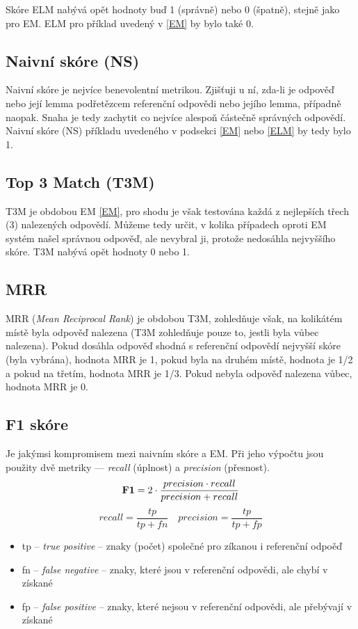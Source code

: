 Skóre ELM nabývá opět hodnoty buď 1 (správně) nebo 0 (špatně), stejně jako pro EM. ELM pro příklad uvedený v \ref{EM} by bylo také 0.

\subsection{Naivní skóre (NS)}
Naivní skóre je nejvíce benevolentní metrikou. Zjišťuji u ní, zda-li je odpověď nebo její lemma podřetězcem referenční odpovědi nebo jejího lemma, případně naopak. Snaha je tedy zachytit co nejvíce alespoň částečně správných odpovědí. Naivní skóre (NS) příkladu uvedeného v podsekci \ref{EM} nebo \ref{ELM} by tedy bylo 1. 

\subsection{Top 3 Match (T3M)}
T3M je obdobou EM \ref{EM}, pro shodu je však testována každá z nejlepších třech (3) nalezených odpovědí. Můžeme tedy určit, v kolika případech oproti EM systém našel správnou odpověď, ale nevybral ji, protože nedosáhla nejvyššího skóre. T3M nabývá opět hodnoty 0 nebo 1.

\subsection{MRR}
MRR (\emph{Mean Reciprocal Rank}) je obdobou T3M, zohledňuje však, na kolikátém místě byla odpověď nalezena (T3M zohledňuje pouze to, jestli byla vůbec nalezena). Pokud dosáhla odpověď shodná s referenční odpovědí nejvyšší skóre (byla vybrána), hodnota MRR je 1, pokud byla na druhém místě, hodnota je 1/2 a pokud na třetím, hodnota MRR je 1/3. Pokud nebyla odpověď nalezena vůbec, hodnota MRR je 0.

\subsection{F1 skóre}
Je jakýmsi kompromisem mezi naivním skóre a EM. Při jeho výpočtu jsou použity dvě metriky --- \emph{recall} (úplnost) a \emph{precision} (přesnost).
\begin{equation}
    \text{\textbf{F1}} = 2\cdot \frac{precision \cdot recall}{precision + recall} 
\end{equation}
\begin{equation}
recall = \frac{tp}{tp+fn} \quad precision = \frac{tp}{tp+fp}
\end{equation}

\begin{itemize}
    \item tp -- \emph{true positive} -- znaky (počet) společné pro zíkanou i referenční odpoěď
    \item fn -- \emph{false negative} -- znaky, které jsou v referenční odpovědi, ale chybí v získané
    \item fp -- \emph{false positive} -- znaky, které nejsou v referenční odpovědi, ale přebývají v získané
\end{itemize}

